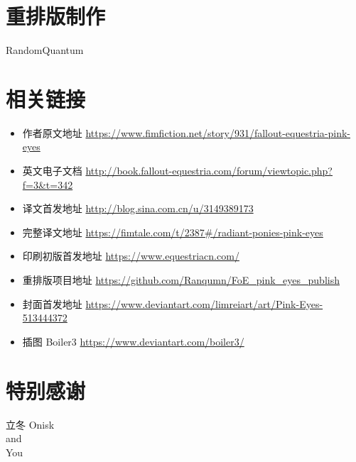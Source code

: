 \section*{重排版制作}

\begin{center}
    RandomQuantum
\end{center}

\section*{相关链接}

\begin{itemize}
    \item 作者原文地址 \url{https://www.fimfiction.net/story/931/fallout-equestria-pink-eyes}
    \item 英文电子文档 \url{http://book.fallout-equestria.com/forum/viewtopic.php?f=3\&t=342}
    \item 译文首发地址 \url{http://blog.sina.com.cn/u/3149389173}
    \item 完整译文地址 \url{https://fimtale.com/t/2387\#/radiant-ponies-pink-eyes}
    \item 印刷初版首发地址 \url{https://www.equestriacn.com/}
    \item 重排版项目地址 \url{https://github.com/Ranqumn/FoE_pink_eyes_publish}
    \item 封面首发地址 \url{https://www.deviantart.com/limreiart/art/Pink-Eyes-513444372}
    \item 插图 Boiler3 \url{https://www.deviantart.com/boiler3/}
\end{itemize}


\section*{特别感谢}

\begin{center}
    立冬 \quad Onisk \bigskip \\
    and \bigskip \\
    You
\end{center}

\clearpage



\fancyhf{} %

\fancyhead[LE,RO]{\thepage}



